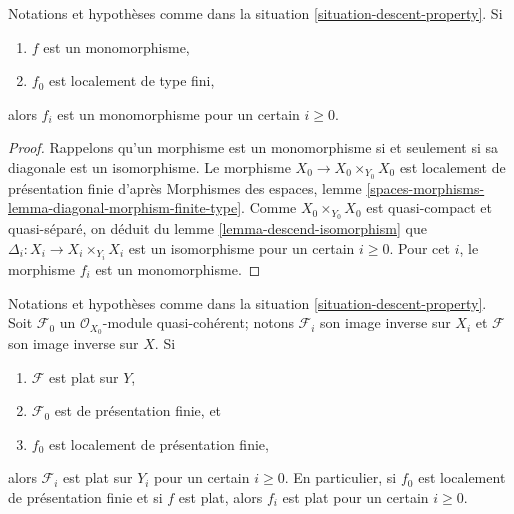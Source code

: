 \begin{lemma}
\label{lemma-descend-monomorphism}
Notations et hypothèses comme dans la situation \ref{situation-descent-property}. Si
\begin{enumerate}
\item $f$ est un monomorphisme,
\item $f_0$ est localement de type fini,
\end{enumerate}
alors $f_i$ est un monomorphisme pour un certain $i \geq 0$.
\end{lemma}

\begin{proof}
Rappelons qu'un morphisme est un monomorphisme si et seulement si sa diagonale est
un isomorphisme. Le morphisme $X_0 \to X_0 \times_{Y_0} X_0$ est localement de
présentation finie d'après
Morphismes des espaces, lemme
\ref{spaces-morphisms-lemma-diagonal-morphism-finite-type}.
Comme $X_0 \times_{Y_0} X_0$ est quasi-compact et quasi-séparé,
on déduit du
lemme \ref{lemma-descend-isomorphism}
que $\Delta_i : X_i \to X_i \times_{Y_i} X_i$ est un isomorphisme pour
un certain $i \geq 0$. Pour cet $i$, le morphisme $f_i$ est un monomorphisme.
\end{proof}

\begin{lemma}
\label{lemma-descend-flat}
Notations et hypothèses comme dans la situation \ref{situation-descent-property}.
Soit $\mathcal{F}_0$ un $\mathcal{O}_{X_0}$-module quasi-cohérent;
notons $\mathcal{F}_i$ son image inverse sur $X_i$ et $\mathcal{F}$
son image inverse sur $X$. Si
\begin{enumerate}
\item $\mathcal{F}$ est plat sur $Y$,
\item $\mathcal{F}_0$ est de présentation finie, et
\item $f_0$ est localement de présentation finie,
\end{enumerate}
alors $\mathcal{F}_i$ est plat sur $Y_i$ pour un certain $i \geq 0$.
En particulier, si $f_0$ est localement de présentation finie et si
$f$ est plat, alors $f_i$ est plat pour un certain $i \geq 0$.
\end{lemma}

